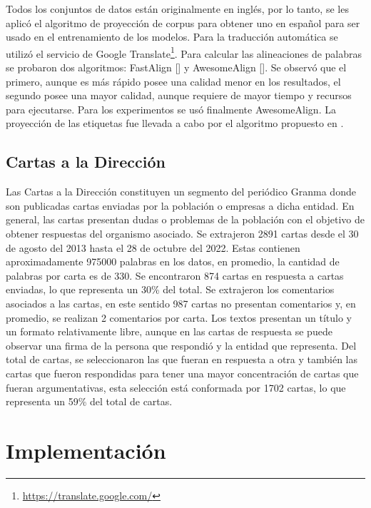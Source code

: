 Todos los conjuntos de datos están originalmente en inglés, por lo tanto, se les aplicó el algoritmo de proyección
de corpus para obtener uno en español para ser usado en el entrenamiento de los modelos. 
Para la traducción automática se utilizó el servicio de Google Translate\footnote{\href{https://translate.google.com/}{https://translate.google.com/}}. 
Para calcular las 
alineaciones de palabras se probaron dos algoritmos: FastAlign [\cite{dyer2013fastalign}] y AwesomeAlign 
[\cite{dou2021word}]. Se observó que el primero, aunque es más rápido posee una calidad menor en los resultados,
el segundo posee una mayor calidad, aunque requiere de mayor tiempo y recursos para ejecutarse. Para los experimentos
se usó finalmente AwesomeAlign. La proyección de las etiquetas fue llevada a cabo por el algoritmo propuesto 
en \textcite{eger2018cross}.

\subsection{Cartas a la Dirección}

Las Cartas a la Dirección constituyen un segmento del periódico Granma donde son publicadas
cartas enviadas por la población o empresas a dicha entidad. En general, las cartas 
presentan dudas o problemas de la población con el objetivo de obtener respuestas del organismo
asociado. Se extrajeron 2891 cartas desde el 30 de agosto del 2013 hasta el 28 de octubre del 2022. Estas 
contienen aproximadamente 975000 palabras en los datos, en promedio, la cantidad de palabras por carta es de 330.
Se encontraron 874 cartas en respuesta a cartas enviadas, lo que representa un 30\% del total. Se extrajeron
los comentarios asociados a las cartas, en este sentido 987 cartas no presentan comentarios y, en promedio, 
se realizan 2 comentarios por carta. Los textos presentan un título y un formato relativamente libre, 
aunque en las cartas de respuesta se puede observar una firma de la persona que respondió y la entidad que 
representa. Del total de cartas, se seleccionaron las que fueran en respuesta a otra y también las 
cartas que fueron respondidas para tener una mayor concentración de cartas que fueran argumentativas, 
esta selección está conformada por 1702 cartas, lo que representa un 59\% del total de cartas.

\section{Implementación}

